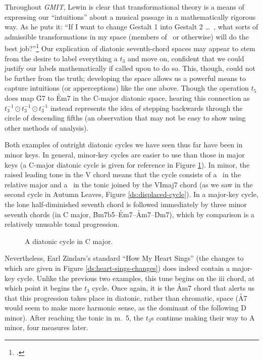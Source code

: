 Throughout \emph{GMIT}, Lewin is clear that transformational theory is a means
of expressing our “intuitions” about a musical passage in a mathematically
rigorous way. As he puts it: “If I want to change Gestalt 1 into
Gestalt 2 \ldots\ , what sorts of admissible transformations in my space
(members of \strans\ or otherwise) will do the best
job?”\footcite[159]{lewin:gmit} Our explication of diatonic seventh-chord
spaces may appear to stem from the desire to label everything a $t_3$ and move
on, confident that we could justify our labels mathematically if called upon
to do so. This, though, could not be further from the truth; developing the
space allows us a powerful means to capture intuitions (or apperceptions) like
the one above. Though the operation $t_5$ does map \h{G7} to \h{Em7} in the
C-major diatonic space, hearing this connection as $t_3^{-1} \odot t_3^{-1} \odot
t_3^{-1}$ instead represents the idea of stepping backwards through the circle
of descending fifths (an observation that may not be easy to show using other
methods of analysis).

Both examples of outright diatonic cycles we have seen thus far have been in
minor keys. In general, minor-key cycles are easier to use than those in major
keys (a C-major diatonic cycle is given for reference in Figure
\ref{ds:major-cycle}). In minor, the raised leading tone in the V chord means
that the cycle consists of a \tfo\ in the relative major and a \tfo\ in the
tonic joined by the VImaj7 chord (as we saw in the second cycle in Autumn
Leaves, Figure \ref{ds:displaced-cycle}). In a major-key cycle, the lone
half-diminished seventh chord is followed immediately by three minor seventh
chords (in C major, \h{Bm7b5}--\h{Em7}--\h{Am7}--\h{Dm7}), which by comparison
is a relatively unusable tonal progression.

\begin{figure}[htbp]
  \caption{A diatonic cycle in C major.}
  \label{ds:major-cycle}
\end{figure}

Nevertheless, Earl Zindars’s standard “How My Heart Sings” (the changes to
which are given in Figure \ref{ds:heart-sings-changes}) does indeed contain a
major-key cycle. Unlike the previous two examples, this tune begins
on the iii chord, at which point it begins the $t_3$ cycle. Once again, it is
the \h{Am7} chord that alerts us that this progression takes place in
diatonic, rather than chromatic, space (\h{A7} would seem to make more
harmonic sense, as the dominant of the following D minor). After reaching the
tonic in m.~5, the $t_3$s continue making their way to A minor, four measures
later.

